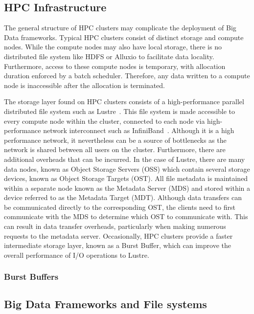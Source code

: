 \documentclass[10pt,journal,compsoc]{IEEEtran}
\begin{document}
\subsection{HPC Infrastructure}
      The general structure of HPC clusters may complicate the deployment of Big Data frameworks.
      Typical HPC clusters consist of distinct storage and compute nodes. While the compute
      nodes may also have local storage, there is no distributed file system like HDFS or
      Alluxio to facilitate data locality. Furthermore, access to these compute nodes is
      temporary, with allocation duration enforced by a batch scheduler. Therefore, any
      data written to a compute node is inaccessible after the allocation is terminated.

      The storage layer found on HPC clusters consists of a high-performance parallel
      distributed file system such as Lustre~\cite{lustre}. This file system is made
      accessible to every compute node within the cluster, connected to each node via
      high-performance network interconnect such as InfiniBand~\cite{infiniband}. Although
      it is a high performance network, it nevertheless can be a source of bottlenecks as
      the network is shared between all users on the cluster. Furthermore, there are
      additional overheads that can be incurred. In the case of Lustre,
      there are many data nodes, known as Object Storage Servers (OSS) which contain
      several storage devices, known as Object Storage Targets (OST). All file metadata
      is maintained within a separate node known as the Metadata Server (MDS) and stored within
      a device referred to as the Metadata Target (MDT). Although data transfers can be
      communicated directly to the corresponding OST, the clients need to first communicate
      with the MDS to determine which OST to communicate with. This can result
      in data transfer overheads, particularly when making numerous requests to the metadata server.
      Occasionally, HPC clusters provide a faster intermediate storage layer, known as a Burst Buffer,
      which can improve the overall performance of I/O operations to Lustre.
    
      \subsubsection{Burst Buffers}

\subsection{Big Data Frameworks and File systems}
\end{document}

